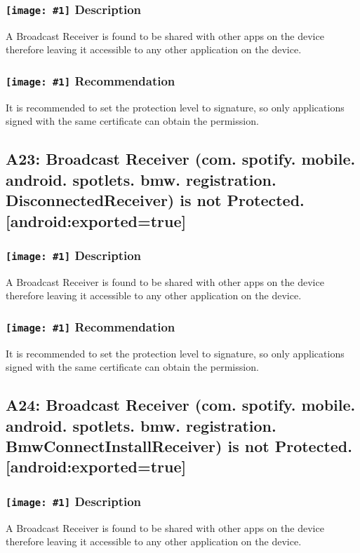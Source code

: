 \documentclass[12p]{article}
\newcommand{\icon}[1]{\texttt{[image: \#1]}}
\begin{document}
\subsubsection*{\protect\icon{/home/miki/Documents/GITHUB/AndroidPermissions/python/vulns/report_icons/basic_sheet.png} Description}
A Broadcast Receiver is found to be shared with other apps on the device therefore leaving it accessible to any other application on the device.
\subsubsection*{\protect\icon{/home/miki/Documents/GITHUB/AndroidPermissions/python/vulns/report_icons/basic_todo.png} Recommendation}
It is recommended to set the protection level to signature, so only applications signed with the same certificate can obtain the permission.
\subsection{A23: Broadcast Receiver (com. spotify. mobile. android. spotlets. bmw. registration. DisconnectedReceiver) is not Protected. [android:exported=true]}
\subsubsection*{\protect\icon{/home/miki/Documents/GITHUB/AndroidPermissions/python/vulns/report_icons/basic_sheet.png} Description}
A Broadcast Receiver is found to be shared with other apps on the device therefore leaving it accessible to any other application on the device.
\subsubsection*{\protect\icon{/home/miki/Documents/GITHUB/AndroidPermissions/python/vulns/report_icons/basic_todo.png} Recommendation}
It is recommended to set the protection level to signature, so only applications signed with the same certificate can obtain the permission.
\subsection{A24: Broadcast Receiver (com. spotify. mobile. android. spotlets. bmw. registration. BmwConnectInstallReceiver) is not Protected. [android:exported=true]}
\subsubsection*{\protect\icon{/home/miki/Documents/GITHUB/AndroidPermissions/python/vulns/report_icons/basic_sheet.png} Description}
A Broadcast Receiver is found to be shared with other apps on the device therefore leaving it accessible to any other application on the device.
\end{document}
